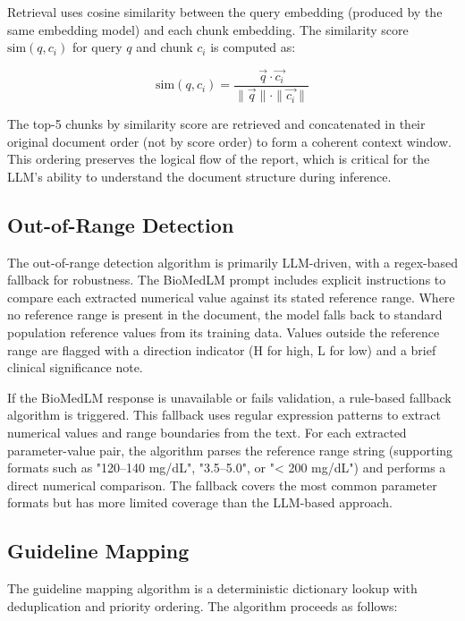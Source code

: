 Retrieval uses cosine similarity between the query embedding (produced by the same embedding model) and each chunk embedding. The similarity score $\text{sim}(q, c_i)$ for query $q$ and chunk $c_i$ is computed as:

\[
\text{sim}(q, c_i) = \frac{\vec{q} \cdot \vec{c_i}}{\|\vec{q}\| \cdot \|\vec{c_i}\|}
\]

The top-5 chunks by similarity score are retrieved and concatenated in their original document order (not by score order) to form a coherent context window. This ordering preserves the logical flow of the report, which is critical for the LLM's ability to understand the document structure during inference.

\subsection{Out-of-Range Detection}
The out-of-range detection algorithm is primarily LLM-driven, with a regex-based fallback for robustness. The BioMedLM prompt includes explicit instructions to compare each extracted numerical value against its stated reference range. Where no reference range is present in the document, the model falls back to standard population reference values from its training data. Values outside the reference range are flagged with a direction indicator (H for high, L for low) and a brief clinical significance note.

If the BioMedLM response is unavailable or fails validation, a rule-based fallback algorithm is triggered. This fallback uses regular expression patterns to extract numerical values and range boundaries from the text. For each extracted parameter-value pair, the algorithm parses the reference range string (supporting formats such as "120--140 mg/dL", "3.5--5.0", or "< 200 mg/dL") and performs a direct numerical comparison. The fallback covers the most common parameter formats but has more limited coverage than the LLM-based approach.

\subsection{Guideline Mapping}
The guideline mapping algorithm is a deterministic dictionary lookup with deduplication and priority ordering. The algorithm proceeds as follows:

